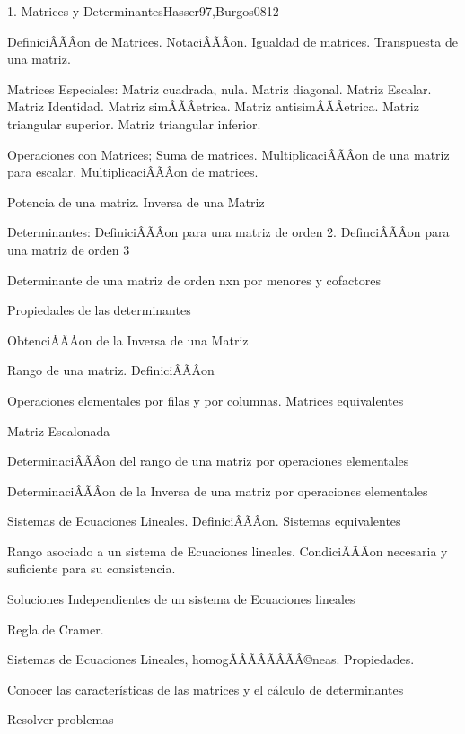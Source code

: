 \begin{sumilla}
\begin{unit}{1. Matrices y Determinantes}{Hasser97,Burgos08}{12}
\begin{topicos}
      \item Definici\ÃÂÃÂon de Matrices. Notaci\ÃÂÃÂon. Igualdad de matrices. Transpuesta de una matriz.
      \item Matrices Especiales: Matriz cuadrada, nula. Matriz diagonal. Matriz  Escalar. Matriz Identidad. Matriz sim\ÃÂÃÂetrica. Matriz antisim\ÃÂÃÂetrica. Matriz  triangular superior. Matriz triangular inferior.
      \item Operaciones con Matrices; Suma de matrices. Multiplicaci\ÃÂÃÂon de una matriz para escalar. Multiplicaci\ÃÂÃÂon de matrices.
	\item Potencia de una matriz. Inversa de una Matriz
	\item Determinantes: Definici\ÃÂÃÂon para una matriz de orden 2. Definci\ÃÂÃÂon para una matriz de orden 3
	\item Determinante de una matriz de orden nxn por menores y cofactores
	\item Propiedades de las determinantes
	\item Obtenci\ÃÂÃÂon de la Inversa de una Matriz
	\item Rango de una matriz. Definici\ÃÂÃÂon
	\item Operaciones elementales por filas y por columnas. Matrices equivalentes
	\item Matriz Escalonada
	\item Determinaci\ÃÂÃÂon del rango de una matriz por operaciones elementales
	\item Determinaci\ÃÂÃÂon de la Inversa de una matriz por operaciones elementales
	\item Sistemas de Ecuaciones Lineales. Definici\ÃÂÃÂon. Sistemas equivalentes
	\item Rango asociado a un sistema de Ecuaciones lineales. Condici\ÃÂÃÂon necesaria y suficiente para su consistencia.
	\item Soluciones Independientes de un sistema de Ecuaciones lineales
	\item Regla de Cramer.
	\item Sistemas de Ecuaciones Lineales, homogÃÂÃÂÃÂÃÂ©neas. Propiedades.
   \end{topicos}

   \begin{objetivos}
      \item Conocer las caracter\'isticas de las matrices y el c\'alculo de determinantes
	\item Resolver problemas
   \end{objetivos}
\end{unit}


\end{sumilla}
